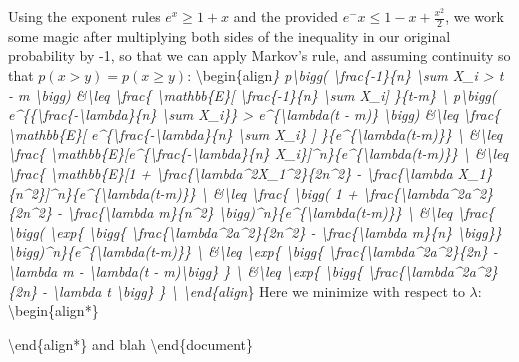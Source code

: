 \documentclass[12pt,a4paper]{article}
\begin{document}
Using the exponent rules $e^x \geq 1 + x$ and the provided $e^-x \leq 1 - x + \frac{x^2}{2}$, we work some magic after multiplying both sides of the inequality in our original probability by -1, so that we can apply Markov's rule, and assuming continuity so that $p(x > y) = p(x \geq y)$: {\textbackslash}begin\{align\emph{\} p{\textbackslash}bigg( {\textbackslash}frac\{-1\}\{n\} {\textbackslash}sum X\_i > t - m {\textbackslash}bigg) \&{\textbackslash}leq {\textbackslash}frac\{ {\textbackslash}mathbb\{E\}[ {\textbackslash}frac\{-1\}\{n\} {\textbackslash}sum X\_i] \}\{t-m\} {\textbackslash}
p{\textbackslash}bigg( e\^{}\{\{{\textbackslash}frac\{-{\textbackslash}lambda\}\{n\} {\textbackslash}sum X\_i\}\} > e\^{}\{{\textbackslash}lambda(t - m)\} {\textbackslash}bigg) \&{\textbackslash}leq {\textbackslash}frac\{ {\textbackslash}mathbb\{E\}[ e\^{}\{{\textbackslash}frac\{-{\textbackslash}lambda\}\{n\} {\textbackslash}sum X\_i\} ] \}\{e\^{}\{{\textbackslash}lambda(t-m)\}\} {\textbackslash}
\&{\textbackslash}leq {\textbackslash}frac\{ {\textbackslash}mathbb\{E\}[e\^{}\{{\textbackslash}frac\{-{\textbackslash}lambda\}\{n\} X\_i\}]\^{}n\}\{e\^{}\{{\textbackslash}lambda(t-m)\}\} {\textbackslash}
\&{\textbackslash}leq {\textbackslash}frac\{ {\textbackslash}mathbb\{E\}[1 + {\textbackslash}frac\{{\textbackslash}lambda\^{}2X\_1\^{}2\}\{2n\^{}2\} - {\textbackslash}frac\{{\textbackslash}lambda X\_1\}\{n\^{}2\}]\^{}n\}\{e\^{}\{{\textbackslash}lambda(t-m)\}\} {\textbackslash}
\&{\textbackslash}leq {\textbackslash}frac\{ {\textbackslash}bigg( 1 + {\textbackslash}frac\{{\textbackslash}lambda\^{}2a\^{}2\}\{2n\^{}2\} - {\textbackslash}frac\{{\textbackslash}lambda m\}\{n\^{}2\} {\textbackslash}bigg)\^{}n\}\{e\^{}\{{\textbackslash}lambda(t-m)\}\} {\textbackslash}
\&{\textbackslash}leq {\textbackslash}frac\{ {\textbackslash}bigg( {\textbackslash}exp\{ {\textbackslash}bigg\{ {\textbackslash}frac\{{\textbackslash}lambda\^{}2a\^{}2\}\{2n\^{}2\} - {\textbackslash}frac\{{\textbackslash}lambda m\}\{n\} {\textbackslash}bigg\}\} {\textbackslash}bigg)\^{}n\}\{e\^{}\{{\textbackslash}lambda(t-m)\}\} {\textbackslash}
\&{\textbackslash}leq {\textbackslash}exp\{ {\textbackslash}bigg\{ {\textbackslash}frac\{{\textbackslash}lambda\^{}2a\^{}2\}\{2n\} - {\textbackslash}lambda m  - {\textbackslash}lambda(t - m){\textbackslash}bigg\} \} {\textbackslash}
\&{\textbackslash}leq {\textbackslash}exp\{ {\textbackslash}bigg\{ {\textbackslash}frac\{{\textbackslash}lambda\^{}2a\^{}2\}\{2n\} - {\textbackslash}lambda t  {\textbackslash}bigg\} \} {\textbackslash}
{\textbackslash}end\{align}\} Here we minimize with respect to $\lambda$: {\textbackslash}begin\{align*\}

{\textbackslash}end\{align*\} and blah {\textbackslash}end\{document\}
\end{document}
